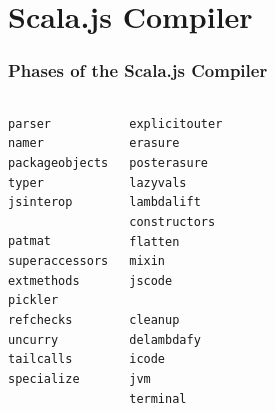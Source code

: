 \documentclass{beamer}
\begin{document}
\section{Scala.js Compiler}

\begin{frame}
  \frametitle{Phases of the Scala.js Compiler}

  \begin{columns}[t]
    \begin{alltt}
      parser\\
      namer\\
      packageobjects\\
      typer\\
      \alert<2>{jsinterop\\}
      patmat\\
      superaccessors\\
      extmethods\\
      pickler\\
      refchecks\\
      uncurry\\
      tailcalls\\
      specialize\\
    \end{alltt}

    \begin{alltt}
      explicitouter\\
      erasure\\
      posterasure\\
      lazyvals\\
      lambdalift\\
      constructors\\
      flatten\\
      mixin\\
      \alert<2>{jscode\\}
      cleanup\\
      delambdafy\\
      icode\\
      jvm\\
      terminal
    \end{alltt}
  \end{columns}
\end{frame}
\end{document}
